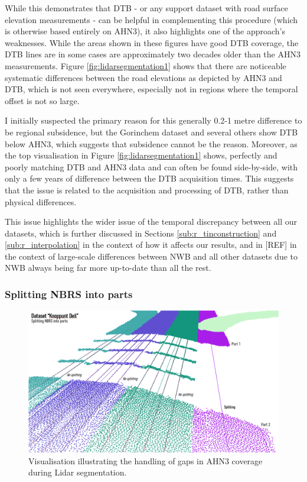 While this demonstrates that DTB - or any support dataset with road surface elevation measurements - can be helpful in complementing this procedure (which is otherwise based entirely on AHN3), it also highlights one of the approach's weaknesses. While the areas shown in these figures have good DTB coverage, the DTB lines are in some cases are approximately two decades older than the AHN3 measurements. Figure \ref{fig:lidarsegmentation1} shows that there are noticeable systematic differences between the road elevations as depicted by AHN3 and DTB, which is not seen everywhere, especially not in regions where the temporal offset is not so large.

I initially suspected the primary reason for this generally 0.2-1 metre difference to be regional subsidence, but the Gorinchem dataset and several others show DTB below AHN3, which suggests that subsidence cannot be the reason. Moreover, as the top visualisation in Figure \ref{fig:lidarsegmentation1} shows, perfectly and poorly matching DTB and AHN3 data and can often be found side-by-side, with only a few years of difference between the DTB acquisition times. This suggests that the issue is related to the acquisition and processing of DTB, rather than physical differences.

This issue highlights the wider issue of the temporal discrepancy between all our datasets, which is further discussed in Sections \ref{sub:r_tinconstruction} and \ref{sub:r_interpolation} in the context of how it affects our results, and in [REF] in the context of large-scale differences between NWB and all other datasets due to NWB always being far more up-to-date than all the rest.

\subsubsection{Splitting NBRS into parts}

\begin{figure}
    \centering
    \includegraphics[width=0.9\linewidth]{final_report/figs/lidarsegmentation2.png}
    \caption{Visualisation illustrating the handling of gaps in AHN3 coverage during Lidar segmentation.}
    \label{fig:lidarsegmentation2}
\end{figure}

